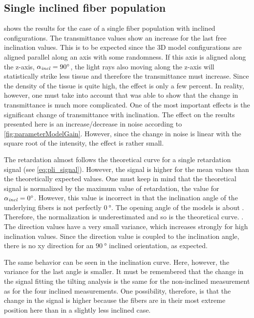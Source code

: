 \subsection{Single inclined fiber population}
 shows the results for the case of a single fiber population with inclined configurations.
The transmittance values show an increase for the last free inclination values.
This is to be expected since the 3D model configurations are aligned parallel along an axis with some randomness.
If this axis is aligned along the z-axis, \ie{} $\textnormal{$\alpha_{\mathit{incl}}$}=\SI{90}{\degree}$, the light rays also moving along the z-axis will statistically strike less tissue and therefore the transmittance must increase.
Since the density of the tissue is quite high, the effect is only a few percent.
In reality, however, one must take into account that \cite{Menzel2021} was able to show that the change in transmittance is much more complicated.
One of the most important effects is the significant change of transmittance with inclination.
The effect on the results presented here is an increase/decrease in noise according to \cref{fig:parameterModelGain}.
However, since the change in noise is linear with the square root of the intensity, the effect is rather small.
\par
%
The retardation almost follows the theoretical curve for a single retardation signal (see \cref{eq:pli_signal}).
However, the signal is higher for the mean values than the theoretically expected values.
One must keep in mind that the theoretical signal is normalized by the maximum value of retardation, \ie{} the value for $\textnormal{$\alpha_{\mathit{incl}}$} = \SI{0}{\degree}$.
However, this value is incorrect in that the inclination angle of the underlying fibers is not perfectly $\SI{0}{\degree}$. The opening angle of the models is about \dummy{}.
Therefore, the normalization is underestimated and so is the theoretical curve.
\dummy{}.
%
The direction values have a very small variance, which increases strongly for high inclination values.
Since the direction value is coupled to the inclination angle, there is no xy direction for an $\SI{90}{\degree}$ inclined orientation, as expected.
\par
%
The same behavior can be seen in the inclination curve.
Here, however, the variance for the last angle is smaller.
It must be remembered that the change in the signal fitting the tilting analysis is the same for the non-inclined measurement as for the four inclined measurements.
One possibility, therefore, is that the change in the signal is higher because the fibers are in their most extreme position here than in a slightly less inclined case.
